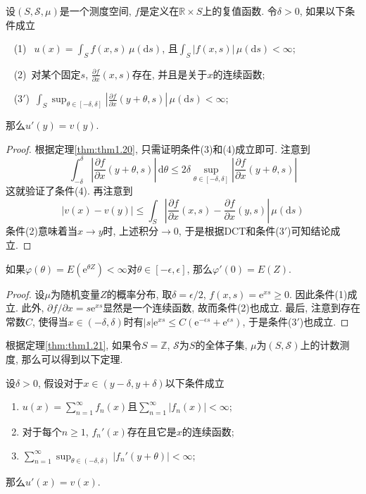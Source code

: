 \documentclass[cn, 12pt, math=mtpro2, bibstyle=apa, blue, twocol]{elegantbook}
\newcommand{\R}{\mathbb{R}}
\newcommand{\SE}{\mathcal{S}}
\begin{document}
\begin{theorem}\label{thm:thm1.21}
  设$(S,\SE,\mu)$是一个测度空间, $f$是定义在$\R\times S$上的复值函数. 令$\delta>0$, 如果以下条件成立

  $\;\;\;$(1) $\;\,\! u(x)=\int_Sf(x,s)\,\mu(\text{d}s)$, 且$\int_S|f(x,s)|\,\mu(\text{d}s)<\infty$;

  $\;\;\;$(2) $\,\!$对某个固定$s$, $\frac{\partial f}{\partial x}(x,s)$存在, 并且是关于$x$的连续函数;

  $\;\;\;$(3$'$) $\,\int_S\sup_{\theta\in[-\delta,\delta]}\left|\frac{\partial f}{\partial x}(y+\theta,s)\right|\,\mu(\text{d}s)<\infty$;

  \noindent 那么$u'(y)=v(y)$.
\end{theorem}
\begin{proof}
  根据定理\ref{thm:thm1.20}, 只需证明条件(3)和(4)成立即可. 注意到
  $$\int_{-\delta}^{\delta}\left|\frac{\partial f}{\partial x}(y+\theta,s)\right|\,\text{d}\theta\leq 2\delta \sup_{\theta\in[-\delta,\delta]}\left|\frac{\partial f}{\partial x}(y+\theta,s)\right|$$
  这就验证了条件(4). 再注意到
  $$|v(x)-v(y)|\leq \int_S\left|\frac{\partial f}{\partial x}(x,s)-\frac{\partial f}{\partial x}(y,s)\right|\,\mu(\text{d}s)$$
  条件(2)意味着当$x\to y$时, 上述积分$\to0$, 于是根据DCT和条件(3$'$)可知结论成立.
\end{proof}
\begin{example}
如果$\varphi(\theta)=E(\text{e}^{\theta Z})<\infty$对$\theta\in[-\epsilon,\epsilon]$, 那么$\varphi'(0)=E(Z)$.
\end{example}
\begin{proof}
  设$\mu$为随机变量$Z$的概率分布, 取$\delta=\epsilon/2$, $f(x,s)=\text{e}^{xs}\ge0$. 因此条件(1)成立. 此外, $\partial f/\partial x=s\text{e}^{xs}$显然是一个连续函数, 故而条件(2)也成立. 最后, 注意到存在常数$C$, 使得当$x\in (-\delta,\delta)$时有$|s|\text{e}^{xs}\leq C(\text{e}^{-\epsilon s}+\text{e}^{\epsilon s})$, 于是条件(3$'$)也成立.
\end{proof}

根据定理\ref{thm:thm1.21}, 如果令$S=\mathbb{Z}$, $\SE$为$S$的全体子集, $\mu$为$(S,\SE)$上的计数测度, 那么可以得到以下定理.
\begin{theorem}
  设$\delta>0$, 假设对于$x\in (y-\delta,y+\delta)$以下条件成立
  \begin{enumerate}[label=(\arabic*)]
    \item $u(x)=\sum_{n=1}^{\infty}f_n(x)$且$\sum_{n=1}^{\infty}|f_n(x)|<\infty$;
    \item 对于每个$n\ge1$, $f_n'(x)$存在且它是$x$的连续函数;
    \item $\sum_{n=1}^{\infty}\sup_{\theta\in(-\delta,\delta)}|f_n'(y+\theta)|<\infty$;
  \end{enumerate}
  那么$u'(x)=v(x)$.
\end{theorem}
\end{document}
